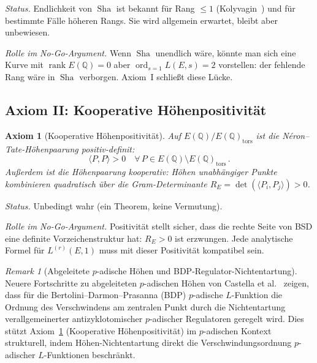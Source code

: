 \documentclass[aps,prd,twocolumn,superscriptaddress,nofootinbib,floatfix]{revtex4-2}
\newtheorem{axiom}[theorem]{Axiom}
\theoremstyle{definition}
\theoremstyle{remark}
\newtheorem{remark}[theorem]{Remark}
\DeclareMathOperator{\ord}{ord}
\DeclareMathOperator{\rank}{rank}
\DeclareMathOperator{\Sha}{Sha}
\begin{document}
\textit{Status.} Endlichkeit von $\Sha$ ist bekannt für Rang $\leq 1$ (Kolyvagin~\cite{Kolyvagin1990}) und für bestimmte Fälle höheren Rangs. Sie wird allgemein erwartet, bleibt aber unbewiesen.

\textit{Rolle im No-Go-Argument.} Wenn $\Sha$ unendlich wäre, könnte man sich eine Kurve mit $\rank E(\mathbb{Q}) = 0$ aber $\ord_{s=1} L(E,s) = 2$ vorstellen: der \glqq fehlende Rang\grqq{} wäre in $\Sha$ verborgen. Axiom~I schließt diese Lücke.

\subsection{Axiom II: Kooperative Höhenpositivität}

\begin{axiom}[Kooperative Höhenpositivität]
\label{ax:positivity}
Auf $E(\mathbb{Q})/E(\mathbb{Q})_{\mathrm{tors}}$ ist die Néron--Tate-Höhenpaarung positiv-definit:
\begin{equation}
\langle P, P \rangle > 0 \quad \forall\, P \in E(\mathbb{Q}) \setminus E(\mathbb{Q})_{\mathrm{tors}}\,.
\end{equation}
Außerdem ist die Höhenpaarung \glqq kooperativ\grqq{}: Höhen unabhängiger Punkte kombinieren quadratisch über die Gram-Determinante $R_E = \det(\langle P_i, P_j \rangle) > 0$.
\end{axiom}

\textit{Status.} Unbedingt wahr (ein Theorem, keine Vermutung).

\textit{Rolle im No-Go-Argument.} Positivität stellt sicher, dass die rechte Seite von BSD eine definite Vorzeichenstruktur hat: $R_E > 0$ ist erzwungen. Jede analytische Formel für $L^{(r)}(E,1)$ muss mit dieser Positivität kompatibel sein.

\begin{remark}[Abgeleitete $p$-adische Höhen und BDP-Regulator-Nichtentartung]
\label{rem:castella-bdp}
Neuere Fortschritte zu abgeleiteten $p$-adischen Höhen von Castella et al.~\cite{Castella2025} zeigen, dass für die Bertolini--Darmon--Prasanna (BDP) $p$-adische $L$-Funktion die Ordnung des Verschwindens am zentralen Punkt durch die Nichtentartung verallgemeinerter antizyklotomischer $p$-adischer Regulatoren geregelt wird. Dies stützt Axiom~\ref{ax:positivity} (Kooperative Höhenpositivität) im $p$-adischen Kontext strukturell, indem Höhen-Nichtentartung direkt die Verschwindungsordnung $p$-adischer $L$-Funktionen beschränkt.
\end{remark}
\end{document}
